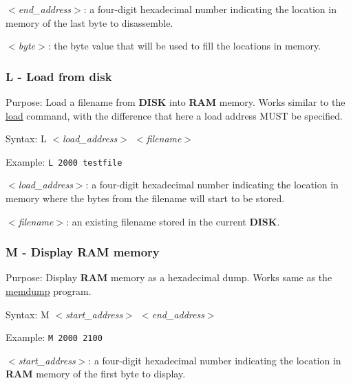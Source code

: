         \hspace{1cm}\textit{$<$end\_address$>$}: a four-digit hexadecimal
        number indicating the location in memory of the last byte to
        disassemble.

        \hspace{1cm}\textit{$<$byte$>$}: the byte value that will be used to
        fill the locations in memory.

        \subsubsection{L - Load from disk}

        Purpose: Load a filename from \textbf{DISK} into \textbf{RAM} memory.
        Works similar to the \hyperref[cmd:load]{load} command, with the
        difference that here a load address MUST be specified.

        Syntax: L \textit{$<$load\_address$>$ $<$filename$>$}

        Example: \texttt{L 2000 testfile}

        \hspace{1cm}\textit{$<$load\_address$>$}: a four-digit hexadecimal
        number indicating the location in memory where the bytes from the
        filename will start to be stored.

        \hspace{1cm}\textit{$<$filename$>$}: an existing filename stored in the
        current \textbf{DISK}.

        \subsubsection{M - Display RAM memory}

        Purpose: Display \textbf{RAM} memory as a hexadecimal dump. Works same
        as the \hyperref[software:memdump]{memdump} program.

        Syntax: M \textit{$<$start\_address$>$ $<$end\_address$>$}

        Example: \texttt{M 2000 2100}

        \hspace{1cm}\textit{$<$start\_address$>$}: a four-digit hexadecimal
        number indicating the location in \textbf{RAM} memory of the first byte
        to display.

